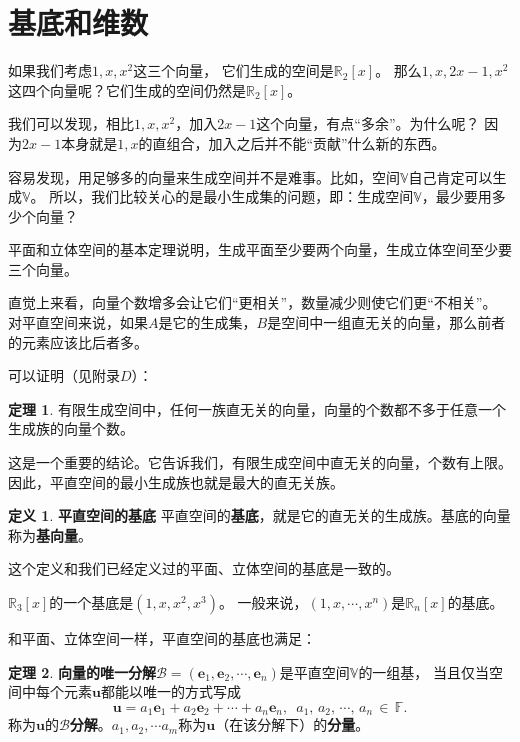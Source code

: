\documentclass[12pt,UTF8]{ctexbook}
\theoremstyle{definition}
\newtheorem{df}{定义}[section]
\newtheorem{tm}{定理}[section]
\theoremstyle{plain}
\begin{document}
\section{基底和维数}

如果我们考虑$1,x,x^2$这三个向量，
它们生成的空间是$\mathbb{R}_2[x]$。
那么$1,x,2x-1,x^2$这四个向量呢？它们生成的空间仍然是$\mathbb{R}_2[x]$。

我们可以发现，相比$1,x,x^2$，加入$2x-1$这个向量，有点“多余”。为什么呢？
因为$2x-1$本身就是$1, x$的直组合，加入之后并不能“贡献”什么新的东西。

容易发现，用足够多的向量来生成空间并不是难事。比如，空间$\mathbb{V}$自己肯定可以生成$\mathbb{V}$。
所以，我们比较关心的是最小生成集的问题，即：生成空间$\mathbb{V}$，最少要用多少个向量？

平面和立体空间的基本定理说明，生成平面至少要两个向量，生成立体空间至少要三个向量。

直觉上来看，向量个数增多会让它们“更相关”，数量减少则使它们更“不相关”。
对平直空间来说，如果$A$是它的生成集，$B$是空间中一组直无关的向量，那么前者的元素应该比后者多。

可以证明（见附录$D$）：
\begin{tm}\label{tm:4-3-10}
    有限生成空间中，任何一族直无关的向量，向量的个数都不多于任意一个生成族的向量个数。
\end{tm}
这是一个重要的结论。它告诉我们，有限生成空间中直无关的向量，个数有上限。
因此，平直空间的最小生成族也就是最大的直无关族。

\begin{df}{\textbf{平直空间的基底}}
    平直空间的\textbf{基底}，就是它的直无关的生成族。基底的向量称为\textbf{基向量}。
\end{df}

这个定义和我们已经定义过的平面、立体空间的基底是一致的。

$\mathbb{R}_3[x]$的一个基底是$(1, x, x^2, x^3)$。
一般来说，$(1, x, \cdots, x^n)$是$\mathbb{R}_n[x]$的基底。

和平面、立体空间一样，平直空间的基底也满足：
\begin{tm}{\textbf{向量的唯一分解}}\label{tm:4-3-20}
    $ \mathcal{B} = (\mathbf{e}_1, \mathbf{e}_2, \cdots , \mathbf{e}_n )$是平直空间$\mathbb{V}$的一组基，
    当且仅当空间中每个元素$\mathbf{u}$都能以唯一的方式写成
    $$ \mathbf{u} = a_1\mathbf{e}_1 +a_2 \mathbf{e}_2 + \cdots + a_n\mathbf{e}_n, \,\,\, a_1,\,a_2,\,\cdots,\, a_n \,\in\,\mathbb{F}.$$
    称为$\mathbf{u}$的$\mathcal{B}$\textbf{分解}。$a_1, a_2, \cdots a_m$称为$\mathbf{u}$（在该分解下）的\textbf{分量}。
\end{tm}
\end{document}
